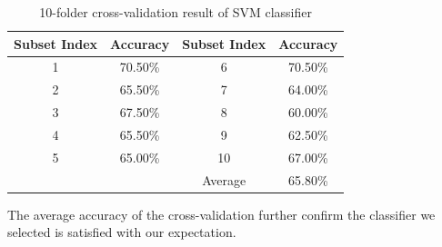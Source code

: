 \begin{table}[!h]
\begin{center}
\begin{tabular}{||c c | c c ||}
\hline
Subset Index & Accuracy & Subset Index & Accuracy \\[0.7ex]
\hline\hline
1 & 70.50\% & 6 & 70.50\% \\
2 & 65.50\% & 7 & 64.00\% \\
3 & 67.50\% & 8 & 60.00\% \\
4 & 65.50\% & 9 & 62.50\% \\
5 & 65.00\% & 10 & 67.00\%  \\
\hline
 & & Average & 65.80\% \\
\hline
\end{tabular}
\caption {10-folder cross-validation result of SVM classifier}
\end{center}
\end{table}
The average accuracy of the cross-validation further confirm the classifier we selected is satisfied with our expectation. 
